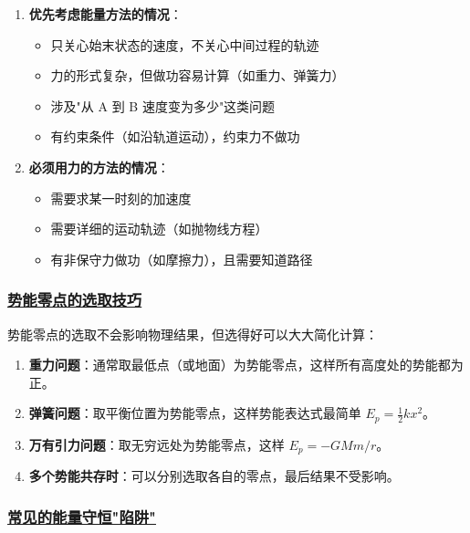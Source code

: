 \begin{enumerate}
    \item \textbf{优先考虑能量方法的情况}：
    \begin{itemize}
        \item 只关心始末状态的速度，不关心中间过程的轨迹
        \item 力的形式复杂，但做功容易计算（如重力、弹簧力）
        \item 涉及"从 A 到 B 速度变为多少"这类问题
        \item 有约束条件（如沿轨道运动），约束力不做功
    \end{itemize}
    \item \textbf{必须用力的方法的情况}：
    \begin{itemize}
        \item 需要求某一时刻的加速度
        \item 需要详细的运动轨迹（如抛物线方程）
        \item 有非保守力做功（如摩擦力），且需要知道路径
    \end{itemize}
\end{enumerate}

\subsubsection{\protect\hyperlink{:}{势能零点的选取技巧}}

势能零点的选取不会影响物理结果，但选得好可以大大简化计算：

\begin{enumerate}
    \item \textbf{重力问题}：通常取最低点（或地面）为势能零点，这样所有高度处的势能都为正。
    \item \textbf{弹簧问题}：取平衡位置为势能零点，这样势能表达式最简单 $E_p = \frac{1}{2}kx^2$。
    \item \textbf{万有引力问题}：取无穷远处为势能零点，这样 $E_p = -GMm/r$。
    \item \textbf{多个势能共存时}：可以分别选取各自的零点，最后结果不受影响。
\end{enumerate}

\subsubsection{\protect\hyperlink{:}{常见的能量守恒"陷阱"}}

